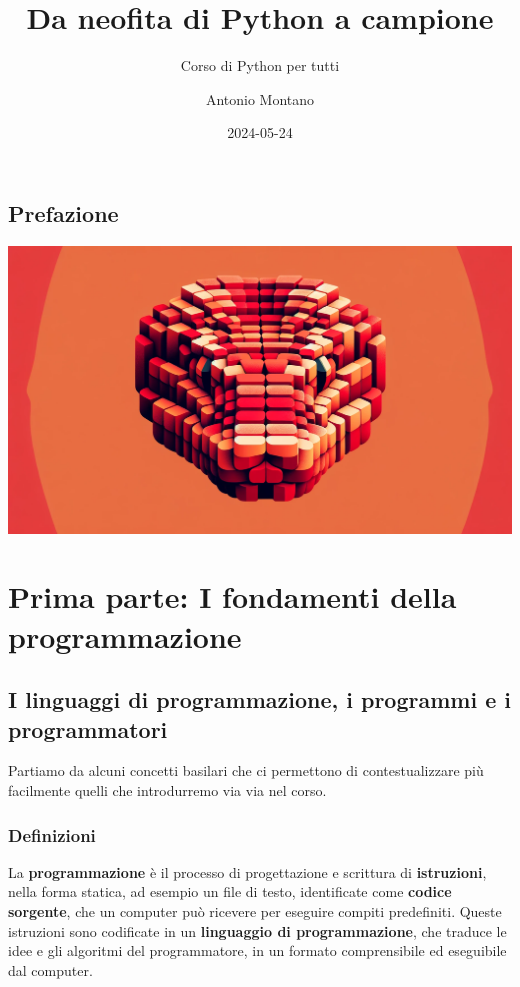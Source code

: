 \documentclass[
  letterpaper,
]{scrbook}
\title{Da neofita di Python a campione}
\subtitle{Corso di Python per tutti}
\author{Antonio Montano}
\date{2024-05-24}
\renewcommand*\contentsname{Indice}
\newcommand\contentsname{Indice}
\begin{document}
\frontmatter
\maketitle

\renewcommand*\contentsname{Indice}
{
\setcounter{tocdepth}{2}
\tableofcontents
}
\mainmatter
{}

\chapter*{Prefazione}\label{prefazione}


\includegraphics{red-python.png}

\part{Prima parte: I fondamenti della programmazione}

\chapter{I linguaggi di programmazione, i programmi e i
programmatori}\label{i-linguaggi-di-programmazione-i-programmi-e-i-programmatori}

Partiamo da alcuni concetti basilari che ci permettono di
contestualizzare più facilmente quelli che introdurremo via via nel
corso.

\section{Definizioni}\label{definizioni}

La \textbf{programmazione} è il processo di progettazione e scrittura di
\textbf{istruzioni}, nella forma statica, ad esempio un file di testo,
identificate come \textbf{codice sorgente}, che un computer può ricevere
per eseguire compiti predefiniti. Queste istruzioni sono codificate in
un \textbf{linguaggio di programmazione}, che traduce le idee e gli
algoritmi del programmatore, in un formato comprensibile ed eseguibile
dal computer.
\end{document}

